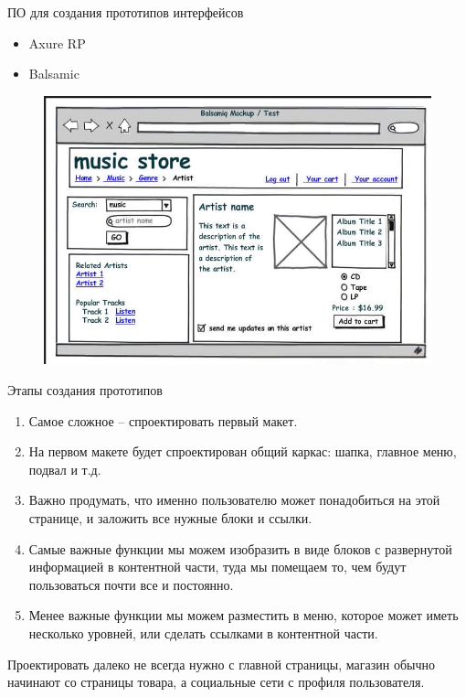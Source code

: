 \documentclass{beamer}
\begin{document}
\begin{frame}[t]{ПО для создания прототипов интерфейсов}
\begin{itemize}
\item Axure RP
\item Balsamic
\end{itemize}
\begin{figure}[h]
\centering
\includegraphics[scale=0.4]{images/balsamiq-1.png}
\end{figure}
\end{frame}

\begin{frame}[t]{Этапы создания прототипов}
\begin{enumerate}
\item Самое сложное – спроектировать первый макет. 
\item На первом макете будет спроектирован общий каркас: шапка, главное меню, подвал и т.д. 
\item Важно продумать, что именно пользователю может понадобиться на этой странице, и заложить все нужные блоки и ссылки. 
\item Самые важные функции мы можем изобразить в виде блоков с развернутой информацией в контентной части, туда мы помещаем то, чем будут пользоваться почти все и постоянно. 
\item Менее важные функции мы можем разместить в меню, которое может иметь несколько уровней, или сделать ссылками в контентной части.
\end{enumerate}
Проектировать далеко не всегда нужно с главной страницы, магазин обычно начинают со страницы товара, а социальные сети с профиля пользователя.
\end{frame}
\end{document}

